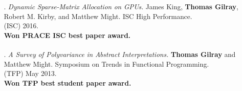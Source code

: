 \paper. \textit{Dynamic Sparse-Matrix Allocation on GPUs.}
James King, \textbf{Thomas Gilray}, Robert M. Kirby, and Matthew Might.
ISC High Performance.
\\(ISC) 2016. 
\\\textbf{Won PRACE ISC best paper award.} \\ \vspace{-0.1cm}\\
\paper. \textit{A Survey of Polyvariance in Abstract Interpretations.}
\textbf{Thomas Gilray} and Matthew Might.
Symposium on Trends in Functional Programming.
\\(TFP) May 2013. 
\\\textbf{Won TFP best student paper award.} \\ \vspace{-0.1cm}\\
